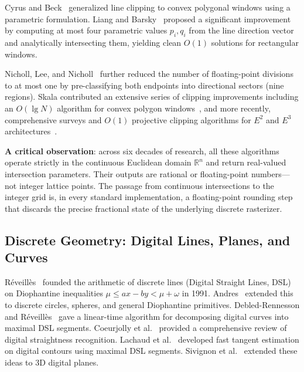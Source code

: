 \documentclass[12pt,a4paper]{article}
\theoremstyle{definition}
\newcommand{\R}{\mathbb{R}}
\begin{document}
Cyrus and Beck~\cite{cyrus1978generalized} generalized line
clipping to convex polygonal windows using a parametric
formulation. Liang and Barsky~\cite{liang1984new} proposed
a significant improvement by computing at most four
parametric values $p_i, q_i$ from the line direction vector
and analytically intersecting them, yielding clean $O(1)$
solutions for rectangular windows.

Nicholl, Lee, and Nicholl~\cite{nicholl1987efficient}
further reduced the number of floating-point divisions to
at most one by pre-classifying both endpoints into
directional sectors (nine regions). Skala contributed an
extensive series of clipping improvements including an $O(\lg N)$
algorithm for convex polygon
windows~\cite{skala1994o_lgn,skala2005homogeneous,skala2012sclip},
and more recently, comprehensive surveys and $O(1)$ projective
clipping algorithms for $E^2$ and $E^3$
architectures~\cite{skala2021comparison,skala2022survey,skala2022two}.

\textbf{A critical observation}: across six decades of research,
all these algorithms operate strictly in the continuous Euclidean
domain $\R^n$ and return real-valued intersection parameters.
Their outputs are rational or floating-point numbers---not integer
lattice points. The passage from continuous intersections to the
integer grid is, in every standard implementation, a floating-point
rounding step that discards the precise fractional state of the
underlying discrete rasterizer.

\subsection{Discrete Geometry: Digital Lines, Planes, and Curves}

R{\'e}veill{\`e}s~\cite{reveilles1991geometrie} founded
the arithmetic of discrete lines (Digital Straight Lines,
DSL) on Diophantine inequalities
$\mu \le ax - by < \mu + \omega$ in 1991. Andres~\cite{andres1994discrete}
extended this to discrete circles, spheres, and general
Diophantine primitives. Debled-Rennesson and
R{\'e}veill{\`e}s~\cite{debled1995linear} gave a
linear-time algorithm for decomposing digital curves into
maximal DSL segments. Coeurjolly et
al.~\cite{coeurjolly2004straightness} provided a
comprehensive review of digital straightness recognition.
Lachaud et al.~\cite{lachaud2007tangent} developed fast
tangent estimation on digital contours using maximal DSL
segments. Sivignon et al.~\cite{sivignon2004decomposition}
extended these ideas to 3D digital planes.
\end{document}
